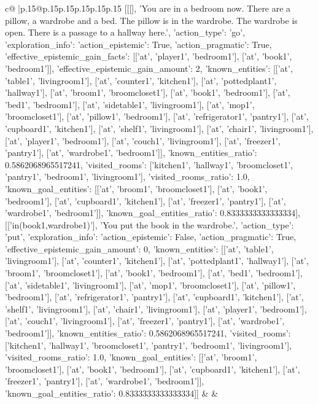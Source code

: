 \documentclass{article}
\begin{document}
{\begin{supertabular}{c@{$\;$}|p{.15\linewidth}@{}p{.15\linewidth}p{.15\linewidth}p{.15\linewidth}p{.15\linewidth}p{.15\linewidth}}
{{{	 [[[], 'You are in a bedroom now. There are a pillow, a wardrobe and a bed. The pillow is in the wardrobe. The wardrobe is open. There is a passage to a hallway here.', {'action_type': 'go', 'exploration_info': {'action_epistemic': True, 'action_pragmatic': True, 'effective_epistemic_gain_facts': [['at', 'player1', 'bedroom1'], ['at', 'book1', 'bedroom1']], 'effective_epistemic_gain_amount': 2, 'known_entities': [['at', 'table1', 'livingroom1'], ['at', 'counter1', 'kitchen1'], ['at', 'pottedplant1', 'hallway1'], ['at', 'broom1', 'broomcloset1'], ['at', 'book1', 'bedroom1'], ['at', 'bed1', 'bedroom1'], ['at', 'sidetable1', 'livingroom1'], ['at', 'mop1', 'broomcloset1'], ['at', 'pillow1', 'bedroom1'], ['at', 'refrigerator1', 'pantry1'], ['at', 'cupboard1', 'kitchen1'], ['at', 'shelf1', 'livingroom1'], ['at', 'chair1', 'livingroom1'], ['at', 'player1', 'bedroom1'], ['at', 'couch1', 'livingroom1'], ['at', 'freezer1', 'pantry1'], ['at', 'wardrobe1', 'bedroom1']], 'known_entities_ratio': 0.5862068965517241, 'visited_rooms': ['kitchen1', 'hallway1', 'broomcloset1', 'pantry1', 'bedroom1', 'livingroom1'], 'visited_rooms_ratio': 1.0, 'known_goal_entities': [['at', 'broom1', 'broomcloset1'], ['at', 'book1', 'bedroom1'], ['at', 'cupboard1', 'kitchen1'], ['at', 'freezer1', 'pantry1'], ['at', 'wardrobe1', 'bedroom1']], 'known_goal_entities_ratio': 0.8333333333333334}}], [['in(book1,wardrobe1)'], 'You put the book in the wardrobe.', {'action_type': 'put', 'exploration_info': {'action_epistemic': False, 'action_pragmatic': True, 'effective_epistemic_gain_amount': 0, 'known_entities': [['at', 'table1', 'livingroom1'], ['at', 'counter1', 'kitchen1'], ['at', 'pottedplant1', 'hallway1'], ['at', 'broom1', 'broomcloset1'], ['at', 'book1', 'bedroom1'], ['at', 'bed1', 'bedroom1'], ['at', 'sidetable1', 'livingroom1'], ['at', 'mop1', 'broomcloset1'], ['at', 'pillow1', 'bedroom1'], ['at', 'refrigerator1', 'pantry1'], ['at', 'cupboard1', 'kitchen1'], ['at', 'shelf1', 'livingroom1'], ['at', 'chair1', 'livingroom1'], ['at', 'player1', 'bedroom1'], ['at', 'couch1', 'livingroom1'], ['at', 'freezer1', 'pantry1'], ['at', 'wardrobe1', 'bedroom1']], 'known_entities_ratio': 0.5862068965517241, 'visited_rooms': ['kitchen1', 'hallway1', 'broomcloset1', 'pantry1', 'bedroom1', 'livingroom1'], 'visited_rooms_ratio': 1.0, 'known_goal_entities': [['at', 'broom1', 'broomcloset1'], ['at', 'book1', 'bedroom1'], ['at', 'cupboard1', 'kitchen1'], ['at', 'freezer1', 'pantry1'], ['at', 'wardrobe1', 'bedroom1']], 'known_goal_entities_ratio': 0.8333333333333334}}]] 
	  } 
	   } 
	   } 
	 & & \\ 
 


\end{supertabular}}
\end{document}

